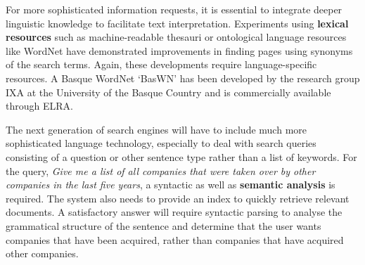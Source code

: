 \begin{multicols}{2}
For more sophisticated information requests, it is essential to integrate deeper linguistic knowledge to facilitate text interpretation. Experiments using \textbf{lexical resources} such as machine-readable thesauri or ontological language resources like WordNet have demonstrated improvements in finding pages using synonyms of the search terms. Again, these developments require language-specific resources. A Basque WordNet ‘BasWN’ has been developed by the research group IXA at the University of the Basque Country and is commercially available through ELRA. 



The next generation of search engines will have to include much more sophisticated language technology, especially to deal with search queries consisting of a question or other sentence type rather than a list of keywords. For the query, \textit{Give me a list of all companies that were taken over by other companies in the last five years}, a syntactic as well as \textbf{semantic analysis} is required. The system also needs to provide an index to quickly retrieve relevant documents. A satisfactory answer will require syntactic parsing to analyse the grammatical structure of the sentence and determine that the user wants companies that have been acquired, rather than companies that have acquired other companies. 



\end{multicols}
